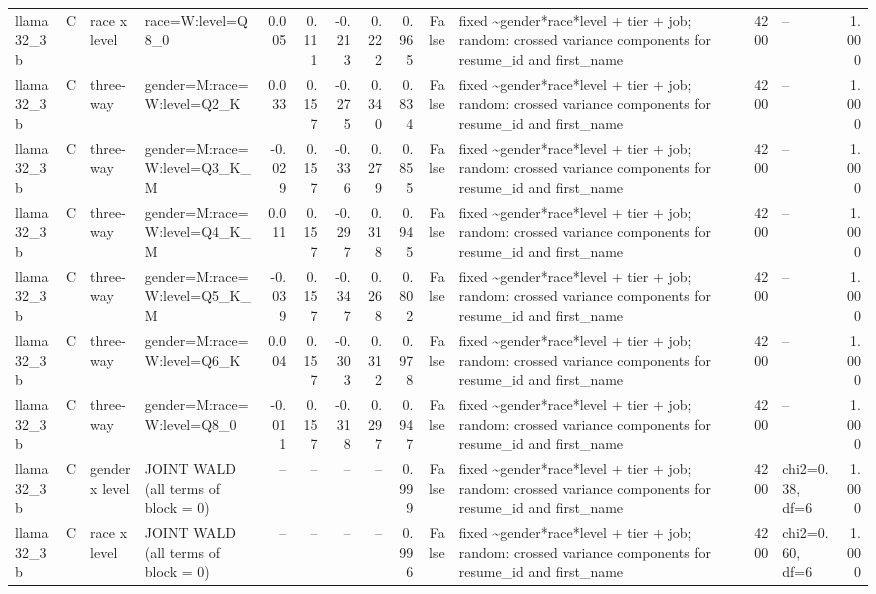 \begin{tabular}{llllrrrrrrlrlr}
llama32\_3b & C & race x level & race=W:level=Q8\_0 & 0.005 & 0.111 & -0.213 & 0.222 & 0.965 & False & fixed \textasciitilde \space gender*race*level + tier + job; random: crossed variance components for resume\_id and first\_name & 4200 & -- & 1.000 \\
llama32\_3b & C & three-way & gender=M:race=W:level=Q2\_K & 0.033 & 0.157 & -0.275 & 0.340 & 0.834 & False & fixed \textasciitilde \space gender*race*level + tier + job; random: crossed variance components for resume\_id and first\_name & 4200 & -- & 1.000 \\
llama32\_3b & C & three-way & gender=M:race=W:level=Q3\_K\_M & -0.029 & 0.157 & -0.336 & 0.279 & 0.855 & False & fixed \textasciitilde \space gender*race*level + tier + job; random: crossed variance components for resume\_id and first\_name & 4200 & -- & 1.000 \\
llama32\_3b & C & three-way & gender=M:race=W:level=Q4\_K\_M & 0.011 & 0.157 & -0.297 & 0.318 & 0.945 & False & fixed \textasciitilde \space gender*race*level + tier + job; random: crossed variance components for resume\_id and first\_name & 4200 & -- & 1.000 \\
llama32\_3b & C & three-way & gender=M:race=W:level=Q5\_K\_M & -0.039 & 0.157 & -0.347 & 0.268 & 0.802 & False & fixed \textasciitilde \space gender*race*level + tier + job; random: crossed variance components for resume\_id and first\_name & 4200 & -- & 1.000 \\
llama32\_3b & C & three-way & gender=M:race=W:level=Q6\_K & 0.004 & 0.157 & -0.303 & 0.312 & 0.978 & False & fixed \textasciitilde \space gender*race*level + tier + job; random: crossed variance components for resume\_id and first\_name & 4200 & -- & 1.000 \\
llama32\_3b & C & three-way & gender=M:race=W:level=Q8\_0 & -0.011 & 0.157 & -0.318 & 0.297 & 0.947 & False & fixed \textasciitilde \space gender*race*level + tier + job; random: crossed variance components for resume\_id and first\_name & 4200 & -- & 1.000 \\
llama32\_3b & C & gender x level & JOINT WALD (all terms of block = 0) & -- & -- & -- & -- & 0.999 & False & fixed \textasciitilde \space gender*race*level + tier + job; random: crossed variance components for resume\_id and first\_name & 4200 & chi2=0.38, df=6 & 1.000 \\
llama32\_3b & C & race x level & JOINT WALD (all terms of block = 0) & -- & -- & -- & -- & 0.996 & False & fixed \textasciitilde \space gender*race*level + tier + job; random: crossed variance components for resume\_id and first\_name & 4200 & chi2=0.60, df=6 & 1.000 \\

\end{tabular}
